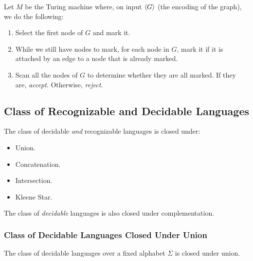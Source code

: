 \documentclass[letterpaper]{article}
\begin{document}
\begin{mdframed}[]
    Let $M$ be the Turing machine where, on input $\langle G \rangle$ (the encoding of the graph), we do the following: 
    \begin{enumerate}
        \item Select the first node of $G$ and mark it. 
        \item While we still have nodes to mark, for each node in $G$, mark it if it is attached by an edge to a node that is already marked. 
        \item Scan all the nodes of $G$ to determine whether they are all marked. If they are, \emph{accept}. Otherwise, \emph{reject}.
    \end{enumerate}
\end{mdframed}


\subsection{Class of Recognizable and Decidable Languages}
The class of decidable \emph{and} recognizable languages is closed under:
\begin{itemize}
    \item Union. 
    \item Concatenation. 
    \item Intersection. 
    \item Kleene Star. 
\end{itemize}
The class of \emph{decidable} languages is also closed under complementation. 

\subsubsection{Class of Decidable Languages Closed Under Union}
\begin{theorem}{}{}
    The class of decidable languages over a fixed alphabet $\Sigma$ is closed under union. 
\end{theorem}
\end{document}
